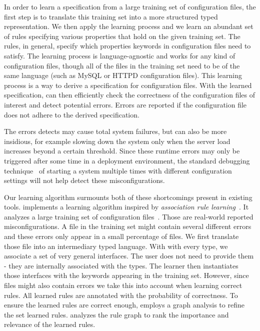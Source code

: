 In order to learn a specification from a large training set of configuration files,
the first step is to 
translate this training set into a more structured typed representation.
We then apply the learning process and we learn an abundant set of rules 
specifying various properties that hold on the given training set. The rules, in general, 
specify which properties keywords in configuration files need to satisfy.
The learning process is language-agnostic and works for any kind 
of configuration files, though all of the files in the training set need to be of 
the same language (such as MySQL or HTTPD configuration files).
This learning process is a way to derive a specification for configuration files. 
With the learned specification, \app can then efficiently check 
the correctness of the configuration files of interest and detect 
potential errors. Errors are reported if the configuration file does not 
adhere to the derived specification.

The errors \app detects may cause total system failures, but can also be more insidious, for example slowing down the system only when the server load increases beyond a certain threshold.
Since these runtime errors may only be triggered after some time in a deployment environment, the standard debugging 
technique~\cite{Zeller:2005:WPF:1077048} of starting a system multiple times with different configuration settings will not help detect these misconfigurations.

Our learning algorithm surmounts both of these shortcomings present in 
existing tools.  \app implements a learning
algorithm inspired by {\em association rule
learning}~\cite{agrawal1993mining}. It analyzes a large training set of configuration files~\cite{configdataset}. Those are real-world reported misconfigurations. 
A file in the training set might contain several different errors and these errors only appear 
in a small percentage of files. 
We first translate those file into an intermediary typed language. 
With with every type, we associate a set of very general interfaces. 
The user does not need to provide them - they are internally associated with the types. 
The learner then instantiates those interfaces with the keywords appearing in 
the training set. However, since files might also contain errors we take 
this into account when learning correct rules. All learned rules are 
annotated with the probability of correctness.  
To ensure the learned rules are correct enough,
\app employs a graph analysis to refine the set learned rules.
\app analyzes the rule graph to rank the importance and relevance of the learned rules. 


